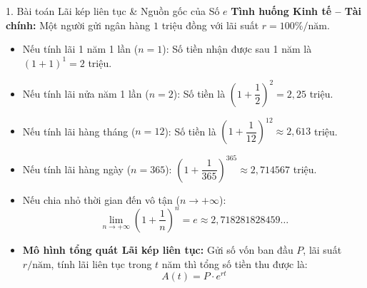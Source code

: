 \documentclass[12pt, a4paper]{article}
\begin{document}
\begin{pedabox}{1. Bài toán Lãi kép liên tục \& Nguồn gốc của Số $e$}
\textbf{Tình huống Kinh tế -- Tài chính:} Một người gửi ngân hàng $1$ triệu đồng với lãi suất $r = 100\%/\text{năm}$.
\begin{itemize}[leftmargin=0.5cm]
    \item Nếu tính lãi 1 năm 1 lần ($n = 1$): Số tiền nhận được sau 1 năm là $(1 + 1)^1 = 2$ triệu.
    \item Nếu tính lãi nửa năm 1 lần ($n = 2$): Số tiền là $\left(1 + \dfrac{1}{2}\right)^2 = 2{,}25$ triệu.
    \item Nếu tính lãi hàng tháng ($n = 12$): Số tiền là $\left(1 + \dfrac{1}{12}\right)^{12} \approx 2{,}613$ triệu.
    \item Nếu tính lãi hàng ngày ($n = 365$): $\left(1 + \dfrac{1}{365}\right)^{365} \approx 2{,}714567$ triệu.
    \item Nếu chia nhỏ thời gian đến vô tận ($n \to +\infty$):
    \begin{equation}
        \lim_{n \to +\infty} \left(1 + \dfrac{1}{n}\right)^n = e \approx 2{,}718281828459\dots
    \end{equation}
    \item \textbf{Mô hình tổng quát Lãi kép liên tục:} Gửi số vốn ban đầu $P$, lãi suất $r/\text{năm}$, tính lãi liên tục trong $t$ năm thì tổng số tiền thu được là:
    \begin{equation}
        A(t) = P \cdot e^{rt}
    \end{equation}
\end{itemize}
\end{pedabox}
\end{document}
